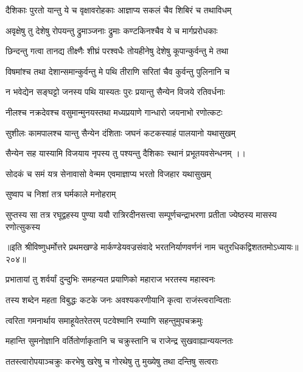 \twolineshloka
{दैशिकाः पुरतो यान्तु ये च वृक्षावरोहकाः}
{आज्ञाप्य सकलं चैव शिबिरं च तथाविधम्}%

\twolineshloka
{अवृक्षेषु तु देशेषु रोपयन्तु द्रुमाञ्जनाः}
{द्रुमाः कण्टकिनश्चैव ये च मार्गप्ररोधकाः}%

\twolineshloka
{छिन्दन्तु गत्वा तानद्य तीक्ष्णैः शीघ्रं परश्वधैः}
{तोयहीनेषु देशेषु कूपान्कुर्वन्तु मे तथा}%

\twolineshloka
{विषमांश्च तथा देशान्समान्कुर्वन्तु मे पथि}
{तीराणि सरितां चैव कुर्वन्तु पुलिनानि च}%

\twolineshloka
{न भवेद्येन सङ्घट्टो जनस्य पथि यास्यतः}
{पुरः प्रयान्तु सैन्येन विजये रतिवर्धनाः}%

\twolineshloka
{नीलश्च नक्रदेवश्च वसुमान्मुनयस्तथा}
{मध्यप्रयाणे गान्धारो जयनाभो रणोत्कटः}%

\twolineshloka
{सुशीलः कामपालश्च यान्तु सैन्येन दंशिताः}
{जघनं कटकस्याहं पालयानो यथासुखम्}%

\twolineshloka
{सैन्येन सह यास्यामि विजयाय नृपस्य तु}
{पश्यन्तु दैशिकाः स्थानं प्रभूतयवसेन्धनम् ।।}%

\twolineshloka
{सोदकं च समं यत्र सेनावासो वेन्मम}
{एवमाज्ञाप्य भरतो विजहार यथासुखम्} %

\onelineshloka
{सुष्वाप च निशां तत्र घर्मकाले मनोहराम्}%

\twolineshloka
{सुप्तस्य सा तत्र रघूद्वहस्य पुण्या ययौ रात्रिरदीनसत्त्वा}
{सम्पूर्णचन्द्राभरणा प्रतीता ज्येष्ठस्य मासस्य रणोत्सुकस्य}%

॥इति श्रीविष्णुधर्मोत्तरे प्रथमखण्डे मार्कण्डेयवज्रसंवादे भरतनिर्याणवर्णनं नाम चतुरधिकद्विशततमोऽध्यायः॥२०४॥



\twolineshloka
{प्रभातायां तु शर्वर्यां दुन्दुभिः समहन्यत}
{प्रयाणिको महाराज भरतस्य महास्वनः}%

\twolineshloka
{तस्य शब्देन महता विबुद्धः कटके जनः}
{अवश्यकरणीयानि कृत्वा राजंस्त्वरान्विताः}%

\twolineshloka
{त्वरिता गमनार्थाय समाहूयेतरेतरम्}
{पटवेश्मानि रम्याणि सहन्तुमुपचक्रमुः}%

\twolineshloka
{महान्ति सुमनोज्ञानि वर्तितोर्णाकृतानि च}
{चक्रुस्तानि च राजेन्द्र सुखवाह्यान्ययत्नतः}%

\twolineshloka
{ततस्त्वारोपयाञ्चक्रुः करभेषु खरेषु च}
{गोरथेषु तु मुख्येषु तथा दन्तिषु सत्वराः}%

